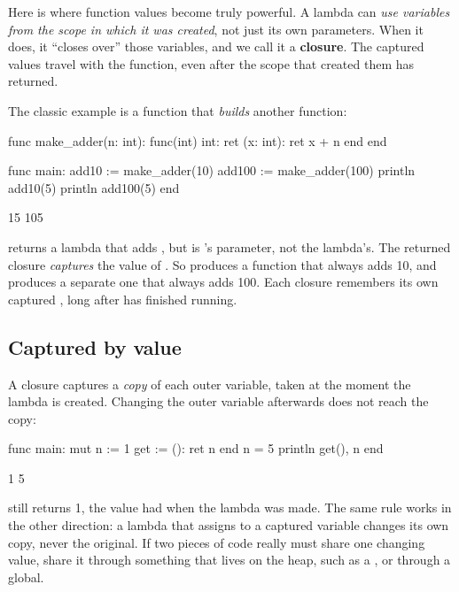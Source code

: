 Here is where function values become truly powerful. A lambda can \emph{use
variables from the scope in which it was created}, not just its own parameters.
When it does, it ``closes over'' those variables, and we call it a
\textbf{closure}. The captured values travel with the function, even after the
scope that created them has returned.

The classic example is a function that \emph{builds} another function:

\begin{salamen}
func make_adder(n: int): func(int) int:
    ret (x: int): ret x + n end
end

func main:
    add10 := make_adder(10)
    add100 := make_adder(100)
    println add10(5)
    println add100(5)
end
\end{salamen}

\begin{progout}
15
105
\end{progout}

 returns a lambda that adds , but  is
's parameter, not the lambda's. The returned closure
\emph{captures} the value of . So  produces a
function that always adds 10, and  produces a separate one
that always adds 100. Each closure remembers its own captured , long after
 has finished running.

\subsection{Captured by value}

A closure captures a \emph{copy} of each outer variable, taken at the moment the
lambda is created. Changing the outer variable afterwards does not reach the
copy:

\begin{salamen}
func main:
    mut n := 1
    get := (): ret n end
    n = 5
    println get(), n
end
\end{salamen}

\begin{progout}
1 5
\end{progout}

 still returns 1, the value  had when the lambda was made. The
same rule works in the other direction: a lambda that assigns to a captured
variable changes its own copy, never the original. If two pieces of code really
must share one changing value, share it through something that lives on the
heap, such as a , or through a  global.

